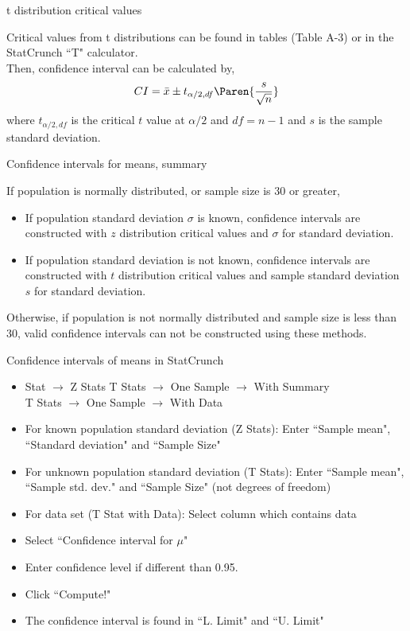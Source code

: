 \documentclass[xcolor=table]{beamer}
\begin{document}
\begin{frame}{t distribution critical values}
\begin{block}{}
\large
Critical values from t distributions can be found in tables (Table A-3) or in the StatCrunch ``T" calculator.\\
\pause\medskip
Then, confidence interval can be calculated by,
\[CI = \bar x \pm t_{\alpha/2, df} \Paren{\frac s {\sqrt n}}\]
where $t_{\alpha/2, df}$ is the critical $t$ value at $\alpha/2$ and $df=n-1$ and $s$ is the sample standard deviation.
\end{block}
\end{frame}

\begin{frame}{Confidence intervals for means, summary}
\begin{block}{}
\large
If population is normally distributed, or sample size is 30 or greater,
\begin{itemize}
\pause\item If population standard deviation $\sigma$ is known, confidence intervals are constructed with $z$ distribution critical values and $\sigma$ for standard deviation.
\pause\item If population standard deviation is not known, confidence intervals are constructed with $t$ distribution critical values and sample standard deviation $s$ for standard deviation.
\end{itemize}
\pause Otherwise, if population is not normally distributed and sample size is less than 30, valid confidence intervals can not be constructed using these methods.
\end{block}
\end{frame}

\begin{frame}{Confidence intervals of means in StatCrunch}
\begin{block}{}
\begin{itemize}
\item Stat $\to$ Z Stats  T Stats $\to$ One Sample $\to$ With Summary \\T Stats $\to$ One Sample $\to$ With Data
\item For known population standard deviation (Z Stats): Enter ``Sample mean", ``Standard deviation" and ``Sample Size" 
\item For unknown population standard deviation (T Stats): Enter ``Sample mean", ``Sample std. dev." and ``Sample Size" (not degrees of freedom)
\item For data set (T Stat with Data): Select column which contains data
\item Select ``Confidence interval for $\mu$"
\item Enter confidence level if different than 0.95.
\item Click ``Compute!"
\item The confidence interval is found in ``L. Limit" and ``U. Limit"
\end{itemize}
\end{block}
\end{frame}
\end{document}

